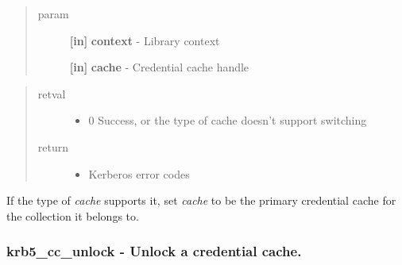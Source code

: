 \documentclass[letterpaper,10pt,english]{sphinxmanual}
\begin{document}
\begin{quote}\begin{description}
\item[{param}] \leavevmode
\textbf{{[}in{]}} \textbf{context} - Library context

\textbf{{[}in{]}} \textbf{cache} - Credential cache handle

\end{description}\end{quote}
\begin{quote}\begin{description}
\item[{retval}] \leavevmode\begin{itemize}
\item {} 
0   Success, or the type of cache doesn't support switching

\end{itemize}

\item[{return}] \leavevmode\begin{itemize}
\item {} 
Kerberos error codes

\end{itemize}

\end{description}\end{quote}

If the type of \emph{cache} supports it, set \emph{cache} to be the primary credential cache for the collection it belongs to.


\subsubsection{krb5\_cc\_unlock -  Unlock a credential cache.}
\label{appdev/refs/api/krb5_cc_unlock:krb5-cc-unlock-unlock-a-credential-cache}\label{appdev/refs/api/krb5_cc_unlock::doc}

\begin{fulllineitems}
\label{appdev/refs/api/krb5_cc_unlock:krb5_cc_unlock}
\end{fulllineitems}
\end{document}
